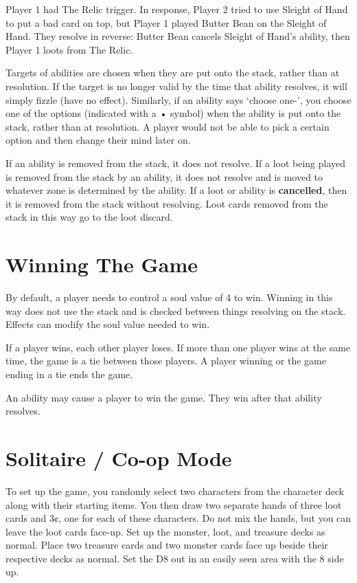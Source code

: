 \documentclass[
  fontsize=10pt,
  paper=a5,
  version=last,
  chapterprefix=true,
  bindingoffset=5mm,
  ]{scrbook}
\begin{document}
    Player 1 had The Relic trigger. In response, Player 2 tried to use Sleight of Hand to put a bad card on top, but Player 1 played Butter Bean on the Sleight of Hand. They resolve in reverse: Butter Bean cancels Sleight of Hand’s ability, then Player 1 loots from The Relic.

    Targets of abilities are chosen when they are put onto the stack, rather than at resolution. If the target is no longer valid by the time that ability resolves, it will simply fizzle (have no effect). Similarly, if an ability says ‘choose one-’, you choose one of the options (indicated with a • symbol) when the ability is put onto the stack, rather than at resolution. A player would not be able to pick a certain option and then change their mind later on.

    If an ability is removed from the stack, it does not resolve. If a loot being played is removed from the stack by an ability, it does not resolve and is moved to whatever zone is determined by the ability. If a loot or ability is \textbf{cancelled}, then it is removed from the stack without resolving. Loot cards removed from the stack in this way go to the loot discard.

    \chapter{Winning The Game}
    \label{winning}
    By default, a player needs to control a soul value of 4 to win. Winning in this way does not use the stack and is checked between things resolving on the stack. Effects can modify the soul value needed to win.

    If a player wins, each other player loses. If more than one player wins at the same time, the game is a tie between those players. A player winning or the game ending in a tie ends the game.

    An ability may cause a player to win the game. They win after that ability resolves.

    \chapter{Solitaire / Co-op Mode}
    \label{solitaire}
    To set up the game, you randomly select two characters from the character deck along with their starting items. You then draw two separate hands of three loot cards and 3¢, one for each of these characters. Do not mix the hands, but you can leave the loot cards face-up. Set up the monster, loot, and treasure decks as normal. Place two treasure cards and two monster cards face up beside their respective decks as normal. Set the D8 out in an easily seen area with the 8 side up.
\end{document}

